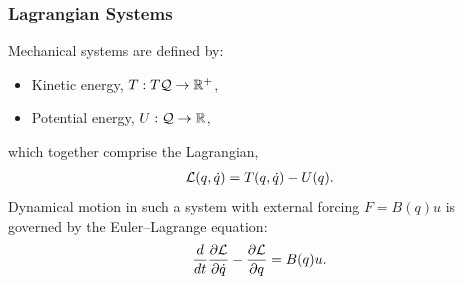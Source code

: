 \documentclass{beamer}
\newcommand{\sQ}{\mathcal{Q}}
\begin{document}
\begin{frame}
  \frametitle{Lagrangian Systems}
  Mechanical systems are defined by:
  \begin{itemize}
  \item Kinetic energy, $T : T\sQ \to \R^+$,\\
  \item Potential energy, $U : \sQ \to \R$,
  \end{itemize}
  which together comprise the Lagrangian,
  \begin{align*}
    \mathcal{L}(q, \dot q) = T(q, \dot q) - U(q).
  \end{align*}
  Dynamical motion in such a system with external forcing $F = B(q) u$ is governed by the Euler--Lagrange equation:
  \begin{align*}
    \frac{d}{dt} \frac{\partial{\ensuremath{\mathcal{L}}}}{\partial{\ensuremath{\dot q}}} - \frac{\partial{\ensuremath{\mathcal{L}}}}{\partial{\ensuremath{q}}} = B(q) u.
  \end{align*}
\end{frame}
\end{document}
